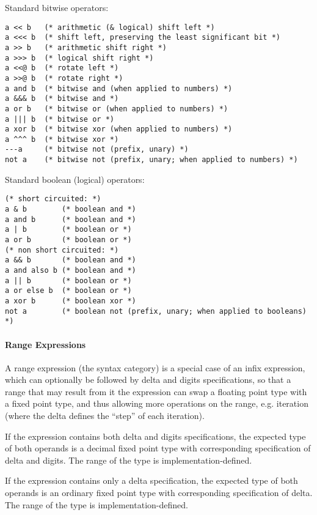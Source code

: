 Standard bitwise operators: 
\begin{lstlisting}
a << b   (* arithmetic (& logical) shift left *)
a <<< b  (* shift left, preserving the least significant bit *)
a >> b   (* arithmetic shift right *)
a >>> b  (* logical shift right *)
a <<@ b  (* rotate left *)
a >>@ b  (* rotate right *)
a and b  (* bitwise and (when applied to numbers) *)
a &&& b  (* bitwise and *)
a or b   (* bitwise or (when applied to numbers) *)
a ||| b  (* bitwise or *)
a xor b  (* bitwise xor (when applied to numbers) *)
a ^^^ b  (* bitwise xor *)
---a     (* bitwise not (prefix, unary) *)
not a    (* bitwise not (prefix, unary; when applied to numbers) *)
\end{lstlisting}

Standard boolean (logical) operators:
\begin{lstlisting}
(* short circuited: *)
a & b        (* boolean and *)
a and b      (* boolean and *)
a | b        (* boolean or *)
a or b       (* boolean or *)
(* non short circuited: *)
a && b       (* boolean and *)
a and also b (* boolean and *)
a || b       (* boolean or *)
a or else b  (* boolean or *)
a xor b      (* boolean xor *)
not a        (* boolean not (prefix, unary; when applied to booleans) *)
\end{lstlisting}






\paragraph{Range Expressions}
A range expression (the  syntax category) is a special case of an infix expression, which can optionally be followed by delta and digits specifications, so that a range that may result from it the expression can swap a floating point type with a fixed point type, and thus allowing more operations on the range, e.g. iteration (where the delta defines the ``step'' of each iteration). 

If the expression contains both delta and digits specifications, the expected type of both operands is a decimal fixed point type with corresponding specification of delta and digits. The range of the type is implementation-defined. 

If the expression contains only a delta specification, the expected type of both operands is an ordinary fixed point type with corresponding specification of delta. The range of the type is implementation-defined. 




